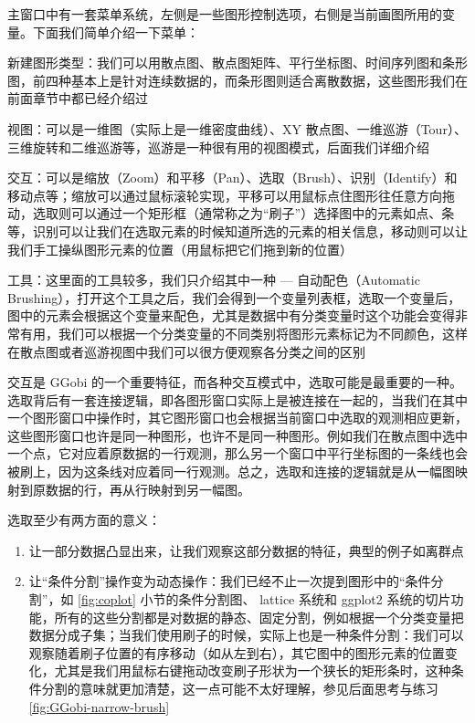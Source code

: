 \documentclass[
  b5paper,
  UTF8,twoside]{book}
\providecommand{\tightlist}{%
  \setlength{\itemsep}{0pt}\setlength{\parskip}{0pt}}
\begin{document}
主窗口中有一套菜单系统，左侧是一些图形控制选项，右侧是当前画图所用的变量。下面我们简单介绍一下菜单：

\begin{description}
\tightlist
\item[Display]
新建图形类型：我们可以用散点图、散点图矩阵、平行坐标图、时间序列图和条形图，前四种基本上是针对连续数据的，而条形图则适合离散数据，这些图形我们在前面章节中都已经介绍过
\item[View]
视图：可以是一维图（实际上是一维密度曲线）、XY 散点图、一维巡游（Tour）、三维旋转和二维巡游等，巡游是一种很有用的视图模式，后面我们详细介绍
\item[Interaction]
交互：可以是缩放（Zoom）和平移（Pan）、选取（Brush）、识别（Identify）和移动点等；缩放可以通过鼠标滚轮实现，平移可以用鼠标点住图形往任意方向拖动，选取则可以通过一个矩形框（通常称之为``刷子''）选择图中的元素如点、条等，识别可以让我们在选取元素的时候知道所选的元素的相关信息，移动则可以让我们手工操纵图形元素的位置（用鼠标把它们拖到新的位置）
\item[Tools]
工具：这里面的工具较多，我们只介绍其中一种 --- 自动配色（Automatic Brushing），打开这个工具之后，我们会得到一个变量列表框，选取一个变量后，图中的元素会根据这个变量来配色，尤其是数据中有分类变量时这个功能会变得非常有用，我们可以根据一个分类变量的不同类别将图形元素标记为不同颜色，这样在散点图或者巡游视图中我们可以很方便观察各分类之间的区别
\end{description}

交互是 GGobi 的一个重要特征，而各种交互模式中，选取可能是最重要的一种。选取背后有一套连接逻辑，即各图形窗口实际上是被连接在一起的，当我们在其中一个图形窗口中操作时，其它图形窗口也会根据当前窗口中选取的观测相应更新，这些图形窗口也许是同一种图形，也许不是同一种图形。例如我们在散点图中选中一个点，它对应着原数据的一行观测，那么另一个窗口中平行坐标图的一条线也会被刷上，因为这条线对应着同一行观测。总之，选取和连接的逻辑就是从一幅图映射到原数据的行，再从行映射到另一幅图。

选取至少有两方面的意义：

\begin{enumerate}
\def\labelenumi{\arabic{enumi}.}
\item
  让一部分数据凸显出来，让我们观察这部分数据的特征，典型的例子如离群点
\item
  让``条件分割''操作变为动态操作：我们已经不止一次提到图形中的``条件分割''，如 \ref{fig:coplot} 小节的条件分割图、 lattice 系统和 ggplot2 系统的切片功能，所有的这些分割都是对数据的静态、固定分割，例如根据一个分类变量把数据分成子集；当我们使用刷子的时候，实际上也是一种条件分割：我们可以观察随着刷子位置的有序移动（如从左到右），其它图中的图形元素的位置变化，尤其是我们用鼠标右键拖动改变刷子形状为一个狭长的矩形条时，这种条件分割的意味就更加清楚，这一点可能不太好理解，参见后面思考与练习 \ref{fig:GGobi-narrow-brush}
\end{enumerate}
\end{document}
